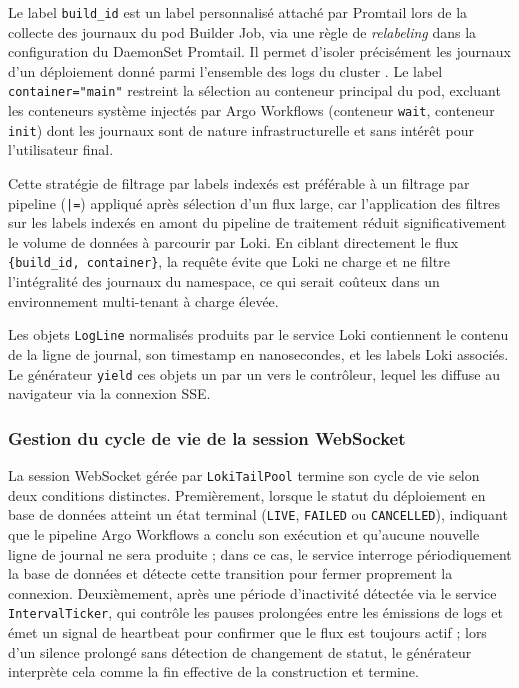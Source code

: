 Le label \texttt{build\_id} est un label personnalisé attaché par Promtail lors de la collecte des journaux du pod Builder Job, via une règle de \textit{relabeling} dans la configuration du DaemonSet Promtail. Il permet d'isoler précisément les journaux d'un déploiement donné parmi l'ensemble des logs du cluster \cite{loki-logql-queries}. Le label \texttt{container="main"} restreint la sélection au conteneur principal du pod, excluant les conteneurs système injectés par Argo Workflows (conteneur \texttt{wait}, conteneur \texttt{init}) dont les journaux sont de nature infrastructurelle et sans intérêt pour l'utilisateur final.

Cette stratégie de filtrage par labels indexés est préférable à un filtrage par pipeline (\texttt{|=}) appliqué après sélection d'un flux large, car l'application des filtres sur les labels indexés en amont du pipeline de traitement réduit significativement le volume de données à parcourir par Loki.  En ciblant directement le flux \texttt{\{build\_id, container\}}, la requête évite que Loki ne charge et ne filtre l'intégralité des journaux du namespace, ce qui serait coûteux dans un environnement multi-tenant à charge élevée.

Les objets \texttt{LogLine} normalisés produits par le service Loki contiennent le contenu de la ligne de journal, son timestamp en nanosecondes, et les labels Loki associés. Le générateur \texttt{yield} ces objets un par un vers le contrôleur, lequel les diffuse au navigateur via la connexion SSE.

\subsubsection*{Gestion du cycle de vie de la session WebSocket}

La session WebSocket gérée par \texttt{LokiTailPool} termine son cycle de vie selon deux conditions distinctes. Premièrement, lorsque le statut du déploiement en base de données atteint un état terminal (\texttt{LIVE}, \texttt{FAILED} ou \texttt{CANCELLED}), indiquant que le pipeline Argo Workflows a conclu son exécution et qu'aucune nouvelle ligne de journal ne sera produite ; dans ce cas, le service interroge périodiquement la base de données et détecte cette transition pour fermer proprement la connexion. Deuxièmement, après une période d'inactivité détectée via le service \texttt{IntervalTicker}, qui contrôle les pauses prolongées entre les émissions de logs et émet un signal de heartbeat pour confirmer que le flux est toujours actif ; lors d'un silence prolongé sans détection de changement de statut, le générateur interprète cela comme la fin effective de la construction et termine.

